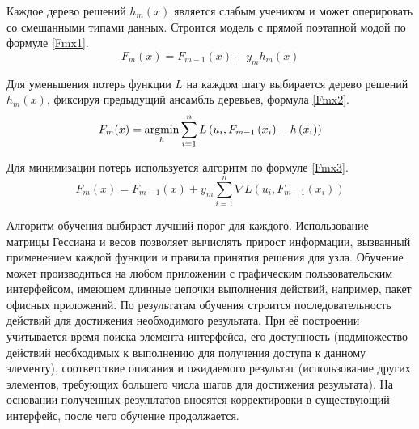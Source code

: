 Каждое дерево решений $h_m(x)$ является слабым учеником и может оперировать со смешанными типами данных. Строится модель с прямой поэтапной модой по формуле \eqref{Fmx1}.
\begin{equation}\label{Fmx1}
   F_m(x)=F_{m-1}(x)+y_m h_m(x)
\end{equation}

Для уменьшения потерь функции $L$ на каждом шагу выбирается дерево решений $h_m(x)$, фиксируя предыдущий ансамбль деревьев, формула \eqref{Fmx2}.
\begin{equation}\label{Fmx2}
   F_m(x)=\argmin\limits_h \sum_{i=1}^n L\left(u_i, F_{m-1}\left(x_i\right)-h\left(x_i\right)\right)
\end{equation}

Для минимизации потерь используется алгоритм по формуле \ref{Fmx3}.
\begin{equation}\label{Fmx3}
   F_m(x)=F_{m-1}(x)+y_m \sum_{i=1}^n \nabla L\left(u_i, F_{m-1}\left(x_i\right)\right)
\end{equation}

	Алгоритм обучения выбирает лучший порог для каждого. Использование матрицы Гессиана и весов позволяет вычислять прирост информации, вызванный применением каждой функции и правила принятия решения для узла.
	Обучение может производиться на любом приложении с графическим пользовательским интерфейсом, имеющем длинные цепочки выполнения действий, например, пакет офисных приложений. По результатам обучения строится последовательность действий для достижения необходимого результата. При её построении учитывается время поиска элемента интерфейса, его доступность (подмножество действий необходимых к выполнению для получения доступа к данному элементу), соответствие описания и ожидаемого результат (использование других элементов, требующих большего числа шагов для достижения результата). На основании полученных результатов вносятся корректировки в существующий интерфейс, после чего обучение продолжается.
\noteattributes{}

